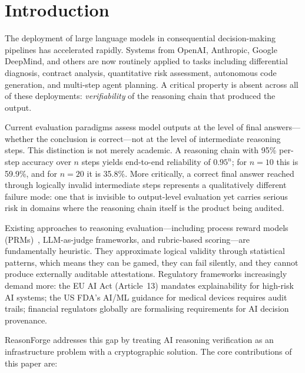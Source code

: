 \documentclass[11pt,a4paper]{article}
\begin{document}
\section{Introduction}
\label{sec:intro}

The deployment of large language models in consequential decision-making
pipelines has accelerated rapidly.  Systems from OpenAI, Anthropic, Google
DeepMind, and others are now routinely applied to tasks including
differential diagnosis, contract analysis, quantitative risk assessment,
autonomous code generation, and multi-step agent planning.  A critical
property is absent across all of these deployments: \emph{verifiability}
of the reasoning chain that produced the output.

Current evaluation paradigms assess model outputs at the level of final
answers---whether the conclusion is correct---not at the level of
intermediate reasoning steps.  This distinction is not merely academic.
A reasoning chain with 95\% per-step accuracy over $n$ steps yields
end-to-end reliability of $0.95^{n}$; for $n = 10$ this is 59.9\%, and
for $n = 20$ it is 35.8\%.  More critically, a correct final answer
reached through logically invalid intermediate steps represents a
qualitatively different failure mode: one that is invisible to
output-level evaluation yet carries serious risk in domains where the
reasoning chain itself is the product being audited.

Existing approaches to reasoning evaluation---including process reward
models (PRMs)~\citep{lightman2023verify,uesato2022solving},
LLM-as-judge frameworks, and rubric-based scoring---are fundamentally
heuristic.  They approximate logical validity through statistical
patterns, which means they can be gamed, they can fail silently, and they
cannot produce externally auditable attestations.  Regulatory frameworks
increasingly demand more: the EU AI Act (Article~13) mandates
explainability for high-risk AI systems; the US FDA's AI/ML guidance for
medical devices requires audit trails; financial regulators globally are
formalising requirements for AI decision provenance.

ReasonForge addresses this gap by treating AI reasoning verification as
an infrastructure problem with a cryptographic solution.  The core
contributions of this paper are:
\end{document}
